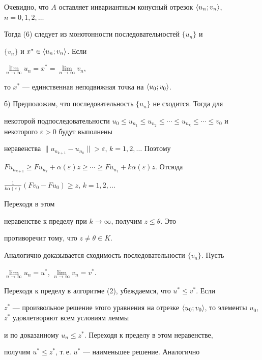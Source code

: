 \begin{pf}
 


Очевидно, что $A$ оставляет инвариантным конусный отрезок $\la 


u_n;v_n\ra$, $n=0,1,2,\dotsc$ 


Тогда (6) следует из монотонности последовательностей $\{u_n\}$ и 


$\{v_n\}$ и $x^*\in\langle u_n;v_n\rangle$. Если 


$\lim\limits_{n\to\infty}u_n=x^*=\lim\limits_{n\to\infty}v_n$, 


то $x^*$ --- единственная неподвижная точка на $\langle u_0;v_0\rangle$. 


 


б) Предположим, что последовательность $\{u_n\}$ не сходится. Тогда для 


некоторой подпоследовательности $u_0\le u_{n_1}\le u_{n_2}\le\dotsb\le 


u_{n_k}\le\dotsb\le v_0$ и некоторого $\varepsilon>0$ будут выполнены 


неравенства $\|u_{n_{k+1}}-u_{n_k}\|>\varepsilon$, $k=1,2,\dotsc$ Поэтому 


$F u_{n_{k+1}}\ge F u_{n_k}+\alpha(\varepsilon)z\ge \dotsb\ge F 


u_{n_1}+k\alpha(\varepsilon)z$. Отсюда 


$\frac{1}{k\alpha(\varepsilon)}(F v_0-F u_0)\ge z$, $k=1,2,\dotsc$ 


Переходя в этом 


неравенстве к пределу при $k\to\infty$, получим $z\le\theta$. Это 


противоречит тому, что $z\ne\theta\in K$. 


 


Аналогично доказывается сходимость последовательности $\{v_n\}$. Пусть 


$\lim\limits_{n\to\infty}u_n{=}u^*$, $\lim\limits_{n\to\infty}v_n{=}v^*$. 


Переходя к пределу в алгоритме (2), убеждаемся, что $u^*\le v^*$. Если 


$z^*$ --- произвольное решение этого уравнения на отрезке $\la 


u_0;v_0\ra$, то элементы $u_0$, $z^*$ удовлетворяют всем условиям леммы 


и по доказанному $u_n\le z^*$. Переходя к пределу в этом неравенстве, 


получим $u^*\le z^*$, т.\,е. $u^*$ --- наименьшее решение. Аналогично 



\end{pf}
